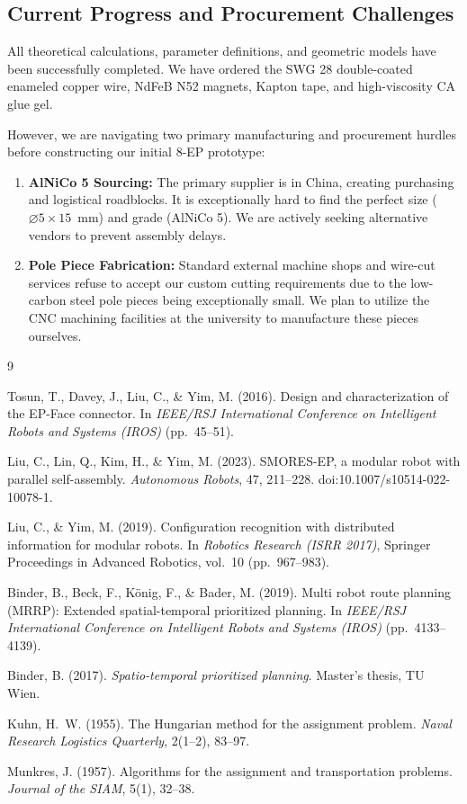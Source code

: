 \documentclass[12pt,a4paper]{article}
\begin{document}
\subsection{Current Progress and Procurement Challenges}
All theoretical calculations, parameter definitions, and geometric models have been successfully completed. We have ordered the SWG 28 double-coated enameled copper wire, NdFeB N52 magnets, Kapton tape, and high-viscosity CA glue gel. 

However, we are navigating two primary manufacturing and procurement hurdles before constructing our initial 8-EP prototype:
\begin{enumerate}
    \item \textbf{AlNiCo 5 Sourcing:} The primary supplier is in China, creating purchasing and logistical roadblocks. It is exceptionally hard to find the perfect size ($\varnothing 5 \times 15$~mm) and grade (AlNiCo 5). We are actively seeking alternative vendors to prevent assembly delays.
    \item \textbf{Pole Piece Fabrication:} Standard external machine shops and wire-cut services refuse to accept our custom cutting requirements due to the low-carbon steel pole pieces being exceptionally small. We plan to utilize the CNC machining facilities at the university to manufacture these pieces ourselves.
\end{enumerate}

% 

\renewcommand{\refname}{Additional References}
\begin{thebibliography}{9}

Tosun, T., Davey, J., Liu, C., \& Yim, M. (2016). Design and characterization
of the EP-Face connector. In \textit{IEEE/RSJ International Conference on
Intelligent Robots and Systems (IROS)} (pp.\ 45--51).

Liu, C., Lin, Q., Kim, H., \& Yim, M. (2023). SMORES-EP, a modular robot with
parallel self-assembly. \textit{Autonomous Robots}, 47, 211--228.
doi:10.1007/s10514-022-10078-1.

Liu, C., \& Yim, M. (2019). Configuration recognition with distributed
information for modular robots. In \textit{Robotics Research (ISRR 2017)},
Springer Proceedings in Advanced Robotics, vol.\ 10 (pp.\ 967--983).

Binder, B., Beck, F., K\"onig, F., \& Bader, M. (2019). Multi robot route
planning (MRRP): Extended spatial-temporal prioritized planning. In
\textit{IEEE/RSJ International Conference on Intelligent Robots and Systems
(IROS)} (pp.\ 4133--4139).

Binder, B. (2017). \textit{Spatio-temporal prioritized planning}. Master's
thesis, TU Wien.

Kuhn, H.\ W. (1955). The Hungarian method for the assignment problem.
\textit{Naval Research Logistics Quarterly}, 2(1--2), 83--97.

Munkres, J. (1957). Algorithms for the assignment and transportation problems.
\textit{Journal of the SIAM}, 5(1), 32--38.

\end{thebibliography}
\end{document}
